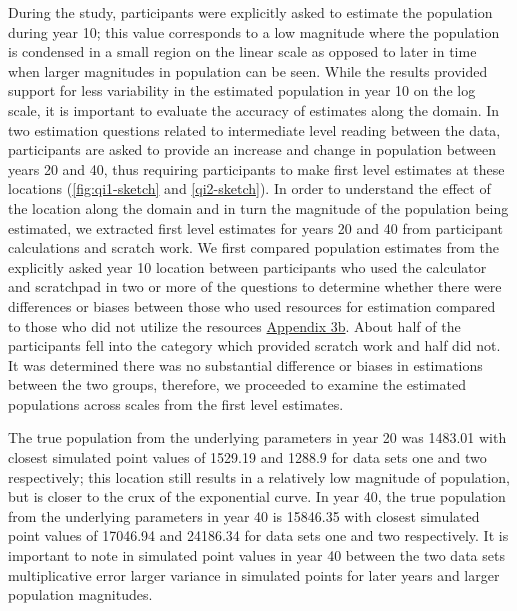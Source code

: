 \documentclass[print]{nuthesis}
\begin{document}
During the study, participants were explicitly asked to estimate the population during year 10; this value corresponds to a low magnitude where the population is condensed in a small region on the linear scale as opposed to later in time when larger magnitudes in population can be seen.
While the results provided support for less variability in the estimated population in year 10 on the log scale, it is important to evaluate the accuracy of estimates along the  domain.
In two estimation questions related to intermediate level reading between the data, participants are asked to provide an increase and change in population between years 20 and 40, thus requiring participants to make first level estimates at these locations (\cref{fig:qi1-sketch} and \cref{qi2-sketch}).
In order to understand the effect of the location along the domain and in turn the magnitude of the population being estimated, we extracted first level estimates for years 20 and 40 from participant calculations and scratch work. 
We first compared population estimates from the explicitly asked year 10 location between participants who used the calculator and scratchpad in two or more of the questions to determine whether there were differences or biases between those who used resources for estimation compared to those who did not utilize the resources \protect\hyperlink{estimation-comparison}{Appendix 3b}.
About half of the participants fell into the category which provided scratch work and half did not.
It was determined there was no substantial difference or biases in estimations between the two groups, therefore, we proceeded to examine the estimated populations across scales from the first level estimates.

The true population from the underlying parameters in year 20 was 1483.01 with closest simulated point values of 1529.19 and 1288.9 for data sets one and two respectively; this location still results in a relatively low magnitude of population, but is closer to the crux of the exponential curve.
In year 40, the true population from the underlying parameters in year 40 is 15846.35 with closest simulated point values of 17046.94 and 24186.34 for data sets one and two respectively.
It is important to note  in simulated point values in year 40 between the two data sets multiplicative error  larger variance in simulated points for later years and larger population magnitudes.
\end{document}
